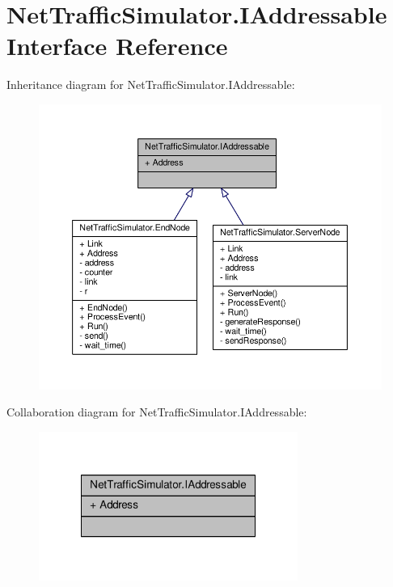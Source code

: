 \hypertarget{interfaceNetTrafficSimulator_1_1IAddressable}{\section{Net\-Traffic\-Simulator.\-I\-Addressable Interface Reference}
\label{interfaceNetTrafficSimulator_1_1IAddressable}
}


Inheritance diagram for Net\-Traffic\-Simulator.\-I\-Addressable\-:\nopagebreak
\begin{figure}[H]
\begin{center}
\leavevmode
\includegraphics[width=350pt]{interfaceNetTrafficSimulator_1_1IAddressable__inherit__graph}
\end{center}
\end{figure}


Collaboration diagram for Net\-Traffic\-Simulator.\-I\-Addressable\-:\nopagebreak
\begin{figure}[H]
\begin{center}
\leavevmode
\includegraphics[width=240pt]{interfaceNetTrafficSimulator_1_1IAddressable__coll__graph}
\end{center}
\end{figure}
